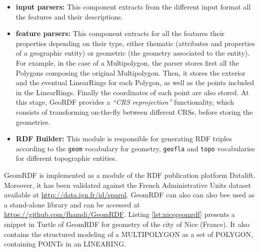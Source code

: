 \begin{itemize}
\item \textbf{input parsers:} This component extracts from the different input format all the features and their descriptions.
\item \textbf{feature parsers:} This component extracts for all the features their properties depending on their type, either thematic (attributes and properties of a geographic entity) or geometric (the geometry associated to the entity). For example, in the case of a Multipolygon, the parser stores first all the Polygons composing the original Multipolygon. Then, it stores the exterior and the eventual LinearRings for each Polygon, as well as the points included in the LinearRings. Finally the coordinates of each point are also stored. At this stage, GeoRDF provides a \textit{``CRS reprojection''} functionality, which consists of transforming on-the-fly between different CRSs, before storing the geometries.

\item  \textbf{RDF Builder:} This module is responsible for generating RDF triples according to the \texttt{geom} vocabulary for geometry, \texttt{geofla} and \texttt{topo} vocabularies for different topographic entities.


\end{itemize}

GeomRDF is implemented as a module of the RDF publication platform Datalift. Moreover, it has been validated against the French Administrative Units dataset available at \url{http://data.ign.fr/id/sparql}. GeomRDF can also can also bee used as a stand-alone library and can be accessed at \url{https://github.com/fhamdi/GeomRDF}. Listing \ref{lst:nicegeomrdf} presents a snippet in Turtle \cite{turtle14} of GeomRDF for geometry of the city of Nice (France). It also contains the structured modeling of a MULTIPOLYGON as a set of POLYGON, containing POINTs in an LINEARING.


